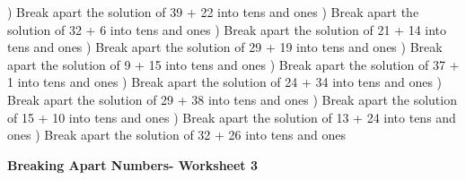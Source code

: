 \documentclass{article}%
\begin{document}
\newline%
) Break apart the solution of 39 + 22 into tens and ones%
\newline%
\newline%
) Break apart the solution of 32 + 6 into tens and ones%
\newline%
\newline%
) Break apart the solution of 21 + 14 into tens and ones%
\newline%
\newline%
) Break apart the solution of 29 + 19 into tens and ones%
\newline%
\newline%
) Break apart the solution of 9 + 15 into tens and ones%
\newline%
\newline%
) Break apart the solution of 37 + 1 into tens and ones%
\newline%
\newline%
) Break apart the solution of 24 + 34 into tens and ones%
\newline%
\newline%
) Break apart the solution of 29 + 38 into tens and ones%
\newline%
\newline%
) Break apart the solution of 15 + 10 into tens and ones%
\newline%
\newline%
) Break apart the solution of 13 + 24 into tens and ones%
\newline%
\newline%
) Break apart the solution of 32 + 26 into tens and ones%
\newline%
\newline%
\newline%
\pagebreak%
\large%
\begin{center}%
\textbf{Breaking Apart Numbers- Worksheet 3}%
\newline%
\newline%
\newline%
\end{center} \normalsize%
\end{document}
